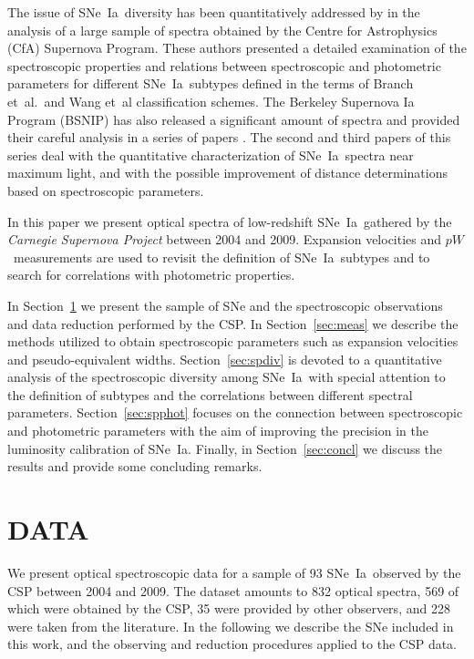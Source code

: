 \documentclass[apj]{emulateapj-rtx4}
\newcommand{\ew}{$pW$}
\newcommand{\sneia}{SNe~Ia}
\begin{document}
The issue of \sneia\ diversity has been quantitatively addressed
  by \citet{blondin12} in the analysis of a large sample of spectra
  obtained by the Centre for Astrophysics (CfA) Supernova
  Program. These authors presented a detailed examination of the spectroscopic
  properties and relations between spectroscopic and photometric
  parameters for different \sneia\ subtypes defined in the terms of Branch
  et~al.~and Wang et~al classification schemes. The Berkeley Supernova Ia Program (BSNIP) has
  also released a significant amount of spectra and provided their
  careful analysis in a series of papers
  \citep{silverman12a,silverman12b,silverman12c,silverman12d}. The
  second and third papers of this series deal with the quantitative
  characterization of \sneia\ spectra near maximum light, and with the
possible improvement of distance determinations based on spectroscopic
parameters.

In this paper we present optical spectra of low-redshift
\sneia\ gathered by the {\em Carnegie Supernova Project}
\citep[CSP;][]{hamuy06} between 2004 and 2009. Expansion velocities and
\ew\ measurements are used to revisit the definition of
\sneia\ subtypes and to search for correlations with photometric
properties. 

In Section~\ref{sec:data} we present the sample of SNe and the
spectroscopic observations and data reduction performed by the CSP. In
Section~\ref{sec:meas} we describe the methods utilized to obtain
spectroscopic parameters such as expansion velocities and
pseudo-equivalent widths. Section~\ref{sec:spdiv} is devoted to a quantitative
analysis of the spectroscopic diversity among \sneia\ with special
attention to the definition of subtypes and the correlations
between different spectral parameters. Section~\ref{sec:spphot}
focuses on the connection between spectroscopic and photometric
parameters with the aim of improving the precision in the luminosity
calibration of \sneia. Finally, in Section~\ref{sec:concl} we
discuss the results and provide some concluding remarks.

\section{DATA}
\label{sec:data}

We present optical spectroscopic data for a sample of 93
\sneia\ observed by the CSP between 2004 and 2009. The dataset amounts
to 832 optical spectra, 569 of which were obtained by the CSP, 35 were
provided by other observers, and 228 were taken from the
literature. In the following we describe the SNe included in this
work, and the observing and reduction procedures applied to the CSP
data. 
\end{document}
